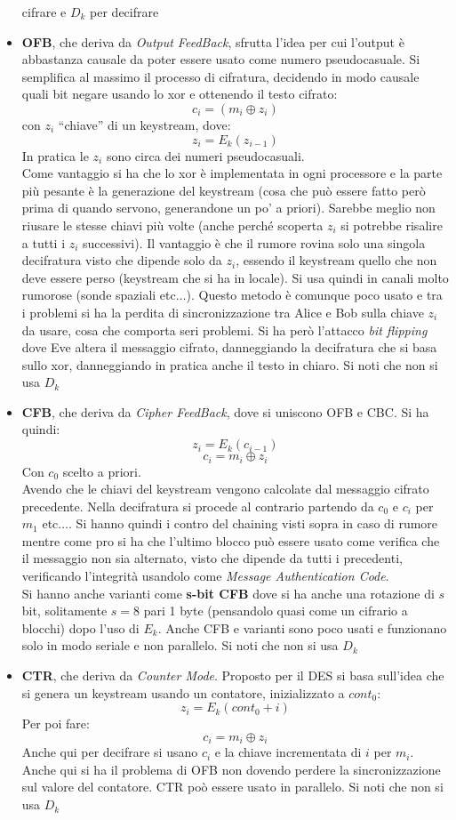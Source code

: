 \documentclass[a4paper,12pt, oneside]{book}
\begin{document}
\begin{itemize}
  cifrare e $D_k$ per decifrare
  \item \textbf{OFB}, che deriva da \textit{Output FeedBack}, sfrutta l'idea per
  cui l'output è abbastanza causale da poter essere usato come numero
  pseudocasuale. Si semplifica al massimo il processo di cifratura, decidendo in
  modo causale quali bit negare usando lo xor e ottenendo il testo cifrato:
  \[c_i=(m_i\oplus z_i)\]
  con $z_i$ ``chiave'' di un keystream, dove:
  \[z_i=E_k(z_{i-1})\]
  In pratica le $z_i$ sono circa dei numeri pseudocasuali.\\
  Come vantaggio si ha che lo xor è implementata in ogni processore e la parte
  più pesante è la generazione del keystream (cosa che può essere fatto però
  prima di quando servono, generandone un po' a priori). Sarebbe meglio non
  riusare le stesse chiavi più volte (anche perché scoperta $z_i$ si potrebbe
  risalire a tutti i $z_i$ successivi). Il vantaggio è che il rumore rovina solo
  una singola decifratura visto che dipende solo da $z_i$, essendo il keystream
  quello che non deve essere perso (keystream che si ha in locale). Si usa
  quindi in canali molto rumorose (sonde spaziali etc$\ldots$). Questo
  metodo è comunque poco usato e tra i problemi si ha la perdita di
  sincronizzazione tra Alice e Bob sulla chiave $z_i$ da usare, cosa che
  comporta seri problemi. Si ha però l'attacco \textit{bit flipping} dove Eve
  altera il messaggio cifrato, danneggiando la decifratura che si basa sullo
  xor, danneggiando in pratica anche il testo in chiaro. Si noti
  che non si usa $D_k$
  \item \textbf{CFB}, che deriva da \textit{Cipher FeedBack}, dove si uniscono
  OFB e CBC. Si ha quindi:
  \[z_i=E_k(c_{i-1})\]
  \[c_i=m_i\oplus z_i\]
  Con $c_0$ scelto a priori.\\
  Avendo che le chiavi del keystream vengono calcolate dal messaggio cifrato
  precedente. Nella decifratura si procede al contrario partendo da $c_0$ e
  $c_i$ per $m_1$ etc$\ldots$. Si hanno quindi i contro del chaining visti
  sopra in caso di rumore mentre come pro si ha che l'ultimo blocco può essere
  usato come verifica che il messaggio non sia alternato, visto che dipende da
  tutti i precedenti, verificando l'integrità usandolo come \textit{Message
    Authentication Code}.\\
  Si hanno anche varianti come \textbf{s-bit CFB} dove si ha anche una rotazione
  di $s$ bit, solitamente $s=8$ pari 1 byte (pensandolo quasi come un cifrario a
  blocchi) dopo l'uso di $E_k$. Anche CFB e varianti sono poco usati e
  funzionano solo in modo seriale e non parallelo. Si noti
  che non si usa $D_k$
  \item \textbf{CTR}, che deriva da \textit{Counter Mode}. Proposto per il DES
  si basa sull'idea che si genera un keystream usando un contatore,
  inizializzato a $cont_0$:
  \[z_i=E_k(cont_0+i)\]
  Per poi fare:
  \[c_i=m_i\oplus z_i\]
  Anche qui per decifrare si usano $c_i$ e la chiave incrementata di $i$ per
  $m_i$.\\ 
  Anche qui si ha il problema di OFB non dovendo perdere la sincronizzazione sul
  valore del contatore. CTR poò essere usato in parallelo. Si noti che non si
  usa $D_k$ 
\end{itemize}
\end{document}
